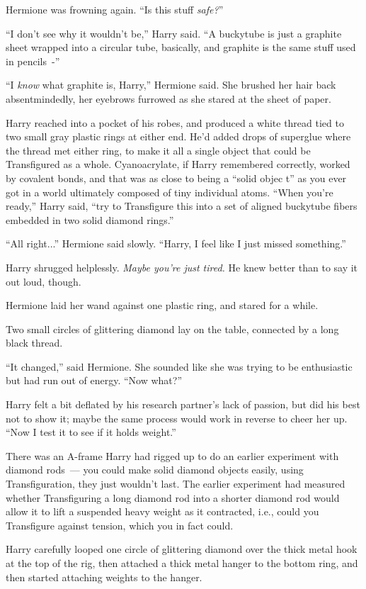 Hermione was frowning again. ``Is this stuff \emph{safe?}''

``I don't see why it wouldn't be,'' Harry said. ``A buckytube is just a graphite sheet wrapped into a circular tube, basically, and graphite is the same stuff used in pencils~-''

``I \emph{know} what graphite is, Harry,'' Hermione said. She brushed her hair back absentmindedly, her eyebrows furrowed as she stared at the sheet of paper.

Harry reached into a pocket of his robes, and produced a white thread tied to two small gray plastic rings at either end. He'd added drops of superglue where the thread met either ring, to make it all a single object that could be Transfigured as a whole. Cyanoacrylate, if Harry remembered correctly, worked by covalent bonds, and that was as close to being a ``solid objec t'' as you ever got in a world ultimately composed of tiny individual atoms. ``When you're ready,'' Harry said, ``try to Transfigure this into a set of aligned buckytube fibers embedded in two solid diamond rings.''

``All right...'' Hermione said slowly. ``Harry, I feel like I just missed something.''

Harry shrugged helplessly. \emph{Maybe you're just tired.} He knew better than to say it out loud, though.

Hermione laid her wand against one plastic ring, and stared for a while.

Two small circles of glittering diamond lay on the table, connected by a long black thread.

``It changed,'' said Hermione. She sounded like she was trying to be enthusiastic but had run out of energy. ``Now what?''

Harry felt a bit deflated by his research partner's lack of passion, but did his best not to show it; maybe the same process would work in reverse to cheer her up. ``Now I test it to see if it holds weight.''

There was an A-frame Harry had rigged up to do an earlier experiment with diamond rods~--- you could make solid diamond objects easily, using Transfiguration, they just wouldn't last. The earlier experiment had measured whether Transfiguring a long diamond rod into a shorter diamond rod would allow it to lift a suspended heavy weight as it contracted, i.e., could you Transfigure against tension, which you in fact could.

Harry carefully looped one circle of glittering diamond over the thick metal hook at the top of the rig, then attached a thick metal hanger to the bottom ring, and then started attaching weights to the hanger.


